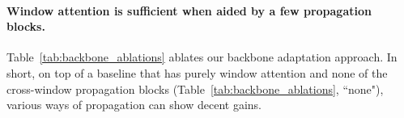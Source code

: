 \documentclass[runningheads]{llncs}
\begin{document}
\paragraph{Window attention is sufficient when aided by a few propagation blocks.} Table~\ref{tab:backbone_ablations} ablates our backbone adaptation approach. In short, on top of a baseline that has purely window attention and none of the cross-window propagation blocks (Table~\ref{tab:backbone_ablations}, ``none"), various ways of propagation can show decent gains.\footnotemark

\end{document}
